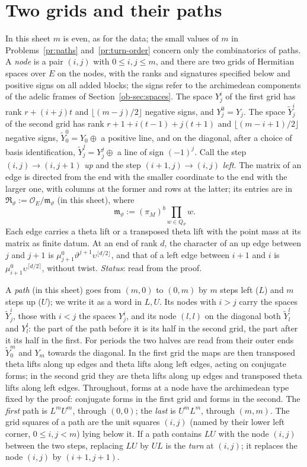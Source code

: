 \documentclass[reqno]{amsart}
\theoremstyle{definition}
\theoremstyle{plain}
\newcommand{\Oc}{\mathcal O}
\newcommand{\Yt}{\widetilde Y}
\newcommand{\Rm}{\mathfrak R}
\begin{document}
\section{Two grids and their paths}\label{sec:paths}

In this sheet \(m\) is even, as for the data; the small values of \(m\) in Problems~\ref{pr:paths} and~\ref{pr:turn-order} concern only the combinatorics of paths.  A \emph{node} is a pair \((i, j)\) with \(0 \le i, j \le m\), and there are two grids of Hermitian spaces over \(E\) on the nodes, with the ranks and signatures specified below and positive signs on all added blocks; the signs refer to the archimedean components of the adelic frames of Section~\ref{ob-sec:spaces}.  The space \(Y^i_j\) of the first grid has rank \(r + (i + j)t\) and \(\lfloor (m-j)/2\rfloor\) negative signs, and \(Y^0_j = Y_j\).  The space \(\Yt^i_j\) of the second grid has rank \(r + 1 + i(t-1) + j(t+1)\) and \(\lfloor (m-i+1)/2 \rfloor\) negative signs, \(\Yt^0_0 = Y_0 \oplus\) a positive line, and on the diagonal, after a choice of basis identification, \(\Yt^j_j = Y^j_j \oplus\) a line of sign \((-1)^j\).  Call the step \((i, j) \to (i, j+1)\) \emph{up} and the step \((i+1, j) \to (i, j)\) \emph{left}.  The matrix of an edge is directed from the end with the smaller coordinate to the end with the larger one, with columns at the former and rows at the latter; its entries are in \(\Rm_\vartheta := \Oc_E/\mathfrak m_\vartheta\) (in this sheet), where
\[
  \mathfrak m_\vartheta := (\pi_M)^b\prod_{w \in Q_\vartheta} w .
\]
Each edge carries a theta lift or a transposed theta lift with the point mass at its matrix as finite datum.  At an end of rank \(d\), the character of an up edge between \(j\) and \(j+1\) is \(\mu^0_{j+1}\vartheta^{j+1}\upsilon^{\lfloor d/2\rfloor}\), and that of a left edge between \(i+1\) and \(i\) is \(\mu^0_{i+1}\upsilon^{\lceil d/2\rceil}\), without twist.  \emph{Status}: read from the proof.

A \emph{path} (in this sheet) goes from \((m, 0)\) to \((0, m)\) by \(m\) steps left (\(L\)) and \(m\) steps up (\(U\)); we write it as a word in \(L, U\).  Its nodes with \(i > j\) carry the spaces \(\Yt^i_j\), those with \(i < j\) the spaces \(Y^i_j\), and its node \((l, l)\) on the diagonal both \(\Yt^l_l\) and \(Y^l_l\): the part of the path before it is its half in the second grid, the part after it its half in the first.  For periods the two halves are read from their outer ends \(\Yt^m_0\) and \(Y_m\) towards the diagonal.  In the first grid the maps are then transposed theta lifts along up edges and theta lifts along left edges, acting on conjugate forms; in the second grid they are theta lifts along up edges and transposed theta lifts along left edges.  Throughout, forms at a node have the archimedean type fixed by the proof: conjugate forms in the first grid and forms in the second.  The \emph{first} path is \(L^mU^m\), through \((0,0)\); the \emph{last} is \(U^mL^m\), through \((m,m)\).  The grid squares of a path are the unit squares \((i, j)\) (named by their lower left corner, \(0 \le i, j < m\)) lying below it.  If a path contains \(LU\) with the node \((i, j)\) between the two steps, replacing \(LU\) by \(UL\) is the \emph{turn} at \((i, j)\); it replaces the node \((i, j)\) by \((i+1, j+1)\).
\end{document}
